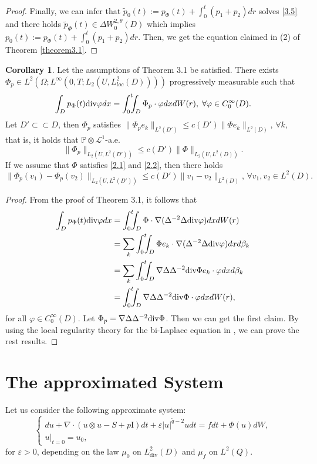\documentclass[reqno]{amsart}
\theoremstyle{definition}
\newtheorem{Corollary}{Corollary}[section]
\theoremstyle{remark}
\numberwithin{equation}{section} \allowdisplaybreaks
\begin{document}
\begin{proof}
Finally, we can infer that
$\tilde{p}_0(t):=p_\Phi(t)+\int_0^t(p_1+p_2)dr$ solves \eqref{3.5}
and there holds $\tilde{p}_{\Phi}(t)\in \Delta W_0^{2,\theta}(D)$
which implies $p_0(t):=p_\Phi(t)+\int_0^t(p_1+p_2)dr$. Then, we get
the equation claimed in (2) of Theorem \ref{theorem3.1}.

\end{proof}



\begin{Corollary}
Let the assumptions of Theorem 3.1 be satisfied. There exists
$\Phi_p\in L^2(\Omega; L^\infty(0,T;L_2({U},L^2_{loc}(D))))$
progressively measurable such that
$$\int_{D}p_\Phi(t){\rm{div}}\varphi dx=\int_0^t\!\!\!\int_{D}\Phi_p\cdot\varphi dx dW(r),\; \forall \varphi\in C_0^\infty(D).$$
Let $D'\subset\subset D$, then $\Phi_p$ satisfies $\|\Phi_p
e_k\|_{L^2(D')}\leq c(D')\|\Phi e_k\|_{L^2(D)}$, $\forall k$, that
is, it holds that $\mathbb{P}\otimes \mathcal{L}^1$-a.e.
$$\|\Phi_p \|_{L_2({U},L^2(D'))}\leq c(D')\|\Phi\|_{L_2({U},L^2(D))}.$$
If we assume that $\Phi$ satisfies \eqref{2.1} and \eqref{2.2}, then there holds
$$\|\Phi_p(v_1)- \Phi_p(v_2)\|_{L_2({U},L^2(D'))}\leq c(D')\|v_1-v_2\|_{L^2(D)},\,\forall v_1, v_2\in
L^2(D).$$
\end{Corollary}

\begin{proof}
From the proof of Theorem 3.1, it follows that
\begin{equation}\label{3.9}
\begin{split}
\int_{D}p_\Phi(t){\rm{div}}\varphi dx&=\int_0^t\!\!\!\int_{D}\Phi\cdot\nabla(\Delta^{-2}\Delta{\rm{div}}\varphi) dx dW(r)\\
&=\sum_k\int_0^t\!\!\!\int_{D}\Phi e_k\cdot\nabla(\Delta^{-2}\Delta{\rm{div}}\varphi) dx d\beta_k\\
&=\sum_k\int_0^t\!\!\!\int_{D}\nabla\Delta\Delta^{-2}{\rm{div}}\Phi e_k \cdot\varphi dxd\beta_k\\
&=\int_0^t\!\!\!\int_{D}\nabla\Delta\Delta^{-2}{\rm{div}}\Phi
\cdot\varphi dxdW(r),
\end{split}
\end{equation}
for all $\varphi\in C_0^\infty(D)$. Let
$\Phi_p=\nabla\Delta\Delta^{-2}\rm{div}\Phi$. Then we can get the
first claim. By using the local regularity theory for the bi-Laplace
equation in \cite{RM}, we can prove the rest results.
\end{proof}


\section{The approximated System}
Let us consider the following approximate system:
\begin{equation}\label{4.1}
\begin{cases}
du+\nabla\cdot(u\otimes u-S+p\text{I})dt+\varepsilon|u|^{\tilde{q}-2}udt=fdt+\Phi(u)dW,\\
u|_{t=0}=u_0,
\end{cases}
\end{equation}
for $\varepsilon>0$, depending on the law $\mu_0$ on
$L^2_{\text{div}}(D)$ and $\mu_f$ on $L^2(Q)$.
\end{document}
